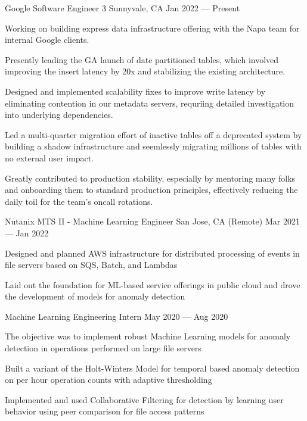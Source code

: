 

\cventry
	{Google}
	{Software Engineer 3}
    {Sunnyvale, CA}
	{Jan 2022 --- Present}
	{%
		\begin{cvitems}
            \item Working on building express data infrastructure offering with the Napa team for internal Google clients.
            \item Presently leading the GA launch of date partitioned tables, which involved improving the insert latency by 20x and stabilizing the existing architecture.
            \item Designed and implemented scalability fixes to improve write latency by eliminating contention in our metadata servers, requriing detailed investigation into underlying dependencies.
            \item Led a multi-quarter migration effort of inactive tables off a deprecated system by building a shadow infrastructure and seemlessly migrating millions of tables with no external user impact.
            \item Greatly contributed to production stability, especially by mentoring many folks and onboarding them to standard production principles, effectively reducing the daily toil for the team's oncall rotations.
		\end{cvitems}
	}

\cventry
	{Nutanix}
	{MTS II - Machine Learning Engineer}
    {San Jose, CA (Remote)}
	{Mar 2021 --- Jan 2022}
	{%
		\begin{cvitems}
            \item Designed and planned AWS infrastructure for distributed processing of events in file servers based on SQS, Batch, and Lambdas
            \item Laid out the foundation for ML-based service offerings in public cloud and drove the development of models for anomaly detection
		\end{cvitems}
	}

\cventry
    {}
	{Machine Learning Engineering Intern}
    {}
	{May 2020 --- Aug 2020}
	{%
		\begin{cvitems}
            \item The objective was to implement robust Machine Learning models for anomaly detection in operations performed on large file servers
            \item Built a variant of the Holt-Winters Model for temporal based anomaly detection on per hour operation counts with adaptive thresholding
            \item Implemented and used Collaborative Filtering for detection by learning user behavior using peer comparison for file access patterns
		\end{cvitems}
	}
	
